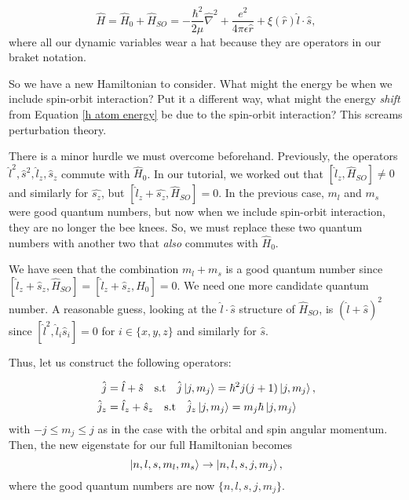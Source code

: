 \documentclass{article}
\numberwithin{equation}{section} %
\begin{document}
\begin{equation}
\hat{H}= \hat{H}_0 + \hat{H}_{SO} = -\frac{\hbar^2}{2\mu}\hat{\nabla}^2 + \frac{e^2}{4\pi\epsilon \hat{r}} +  \xi(\hat{r})\hat{l}\cdot\hat{s},
\end{equation}
where all our dynamic variables wear a hat because they are operators in our braket notation.

So we have a new Hamiltonian to consider. What might the energy be when we include spin-orbit interaction? Put it a different way, what might the energy \textit{shift} from Equation \ref{h atom energy} be due to the spin-orbit interaction? This screams perturbation theory.

There is a minor hurdle we must overcome beforehand. Previously, the operators $\hat{l}^2,\hat{s}^2,\hat{l}_z,\hat{s}_z$ commute with $\hat{H}_0$. In our tutorial, we worked out that $[\hat{l}_z,\hat{H}_{SO}]\neq 0$ and similarly for $\hat{s_z}$, but $[\hat{l}_z+\hat{s_z},\hat{H}_{SO}]= 0$. In the previous case, $m_l$ and $m_s$ were good quantum numbers, but now when we include spin-orbit interaction, they are no longer the bee knees. So, we must replace these two quantum numbers with another two that \textit{also} commutes with $\hat{H}_0$.

We have seen that the combination $m_l+m_s$ is a good quantum number since $[\hat{l}_z+\hat{s}_z,\hat{H}_{SO}]=[\hat{l}_z+\hat{s}_z,\hat{H}_{0}]=0.$ We need one more candidate quantum number. A reasonable guess, looking at the $\hat{l}\cdot\hat{s}$ structure of $\hat{H}_{SO}$, is $(\hat{l}+\hat{s})^2$ since $[\hat{l}^2,\hat{l}_i\hat{s}_i]=0$ for $i\in\{x,y,z\}$ and similarly for $\hat{s}$. 

Thus, let us construct the following operators:

\begin{equation}
\begin{split}
\hat{j}&=\hat{l}+\hat{s} \quad \text{s.t}\quad  \hat{j}\ket{j,m_j} = \hbar^2j(j+1)\ket{j,m_j}, \\
\hat{j}_z&=\hat{l}_z+\hat{s}_z \quad \text{s.t} \quad \hat{j}_z\ket{j,m_j} = m_j\hbar\ket{j,m_j}
\end{split}
\end{equation}
with $-j\leq m_j \leq j$ as in the case with the orbital and spin angular momentum. Then, the new eigenstate for our full Hamiltonian becomes
\begin{equation}
\ket{n,l,s,m_l,m_s}\rightarrow \ket{n,l,s,j,m_j},
\end{equation}
where the good quantum numbers are now $\{n,l,s,j,m_j\}$.
\end{document}
